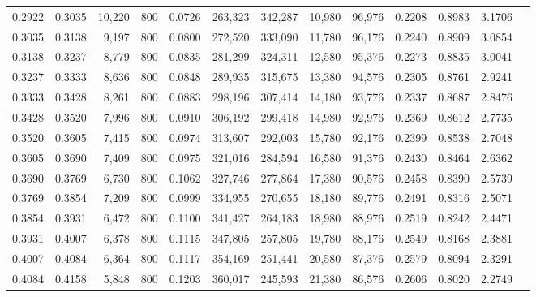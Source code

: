 \begin{tabular}{rrrrrrrrrrrrr}
0.2922 & 0.3035 & 10,220 &   800 &                                     0.0726 & 263,323 & 342,287 &  10,980 &  96,976 & 0.2208 & 0.8983 & 3.1706 \\
0.3035 & 0.3138 &  9,197 &   800 &                                     0.0800 & 272,520 & 333,090 &  11,780 &  96,176 & 0.2240 & 0.8909 & 3.0854 \\
0.3138 & 0.3237 &  8,779 &   800 &                                     0.0835 & 281,299 & 324,311 &  12,580 &  95,376 & 0.2273 & 0.8835 & 3.0041 \\
0.3237 & 0.3333 &  8,636 &   800 &                                     0.0848 & 289,935 & 315,675 &  13,380 &  94,576 & 0.2305 & 0.8761 & 2.9241 \\
0.3333 & 0.3428 &  8,261 &   800 &                                     0.0883 & 298,196 & 307,414 &  14,180 &  93,776 & 0.2337 & 0.8687 & 2.8476 \\
0.3428 & 0.3520 &  7,996 &   800 &                                     0.0910 & 306,192 & 299,418 &  14,980 &  92,976 & 0.2369 & 0.8612 & 2.7735 \\
0.3520 & 0.3605 &  7,415 &   800 &                                     0.0974 & 313,607 & 292,003 &  15,780 &  92,176 & 0.2399 & 0.8538 & 2.7048 \\
0.3605 & 0.3690 &  7,409 &   800 &                                     0.0975 & 321,016 & 284,594 &  16,580 &  91,376 & 0.2430 & 0.8464 & 2.6362 \\
0.3690 & 0.3769 &  6,730 &   800 &                                     0.1062 & 327,746 & 277,864 &  17,380 &  90,576 & 0.2458 & 0.8390 & 2.5739 \\
0.3769 & 0.3854 &  7,209 &   800 &                                     0.0999 & 334,955 & 270,655 &  18,180 &  89,776 & 0.2491 & 0.8316 & 2.5071 \\
0.3854 & 0.3931 &  6,472 &   800 &                                     0.1100 & 341,427 & 264,183 &  18,980 &  88,976 & 0.2519 & 0.8242 & 2.4471 \\
0.3931 & 0.4007 &  6,378 &   800 &                                     0.1115 & 347,805 & 257,805 &  19,780 &  88,176 & 0.2549 & 0.8168 & 2.3881 \\
0.4007 & 0.4084 &  6,364 &   800 &                                     0.1117 & 354,169 & 251,441 &  20,580 &  87,376 & 0.2579 & 0.8094 & 2.3291 \\
0.4084 & 0.4158 &  5,848 &   800 &                                     0.1203 & 360,017 & 245,593 &  21,380 &  86,576 & 0.2606 & 0.8020 & 2.2749 \\

\end{tabular}
